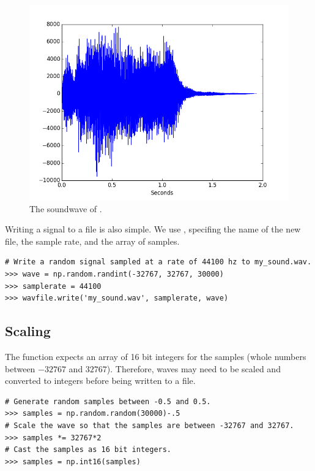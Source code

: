\begin{figure}[ht]
\centering
\includegraphics[width=\textwidth]{tada.png}
\caption{The soundwave of .}
\label{fig:tada_sig}
\end{figure}

Writing a signal to a file is also simple.
We use , specifing the name of the new file, the sample rate, and the array of samples.

\begin{lstlisting}
# Write a random signal sampled at a rate of 44100 hz to my_sound.wav.
>>> wave = np.random.randint(-32767, 32767, 30000)
>>> samplerate = 44100
>>> wavfile.write('my_sound.wav', samplerate, wave)
\end{lstlisting}

\subsection*{Scaling}

The  function expects an array of 16 bit integers for the samples (whole numbers between $-32767$ and $32767$).
Therefore, waves may need to be scaled and converted to integers before being written to a file.

\begin{lstlisting}
# Generate random samples between -0.5 and 0.5.
>>> samples = np.random.random(30000)-.5
# Scale the wave so that the samples are between -32767 and 32767.
>>> samples *= 32767*2
# Cast the samples as 16 bit integers.
>>> samples = np.int16(samples)
\end{lstlisting}

